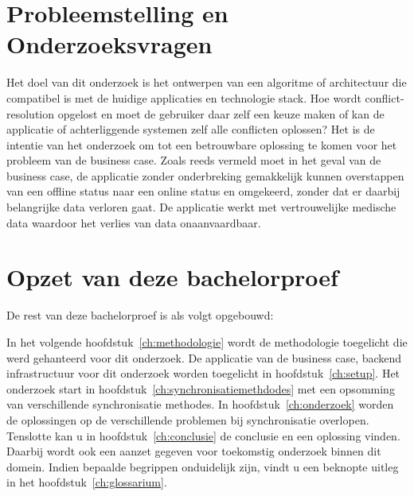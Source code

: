 \section{Probleemstelling en Onderzoeksvragen}
\label{sec:onderzoeksvragen}
Het doel van dit onderzoek is het ontwerpen van een algoritme of architectuur die compatibel is met de huidige applicaties en technologie stack. Hoe wordt conflict-resolution opgelost en moet de gebruiker daar zelf een keuze maken of kan de applicatie of achterliggende systemen zelf alle conflicten oplossen? Het is de intentie van het onderzoek om tot een betrouwbare oplossing te komen voor het probleem van de business case. Zoals reeds vermeld moet in het geval van de business case, de applicatie zonder onderbreking gemakkelijk kunnen overstappen van een offline status naar een online status en omgekeerd, zonder dat er daarbij belangrijke data verloren gaat. De applicatie werkt met vertrouwelijke medische data waardoor het verlies van data onaanvaardbaar.

\clearpage
\section{Opzet van deze bachelorproef}
\label{sec:opzet-bachelorproef}


De rest van deze bachelorproef is als volgt opgebouwd:

In het volgende hoofdstuk~\ref{ch:methodologie} wordt de methodologie toegelicht die werd gehanteerd voor dit onderzoek. De applicatie van de business case, backend infrastructuur voor dit onderzoek worden toegelicht in hoofdstuk~\ref{ch:setup}. Het onderzoek start in hoofdstuk~\ref{ch:synchronisatiemethdodes} met een opsomming van verschillende synchronisatie methodes. In hoofdstuk~\ref{ch:onderzoek} worden de oplossingen op de verschillende problemen bij synchronisatie overlopen. Tenslotte kan u in hoofdstuk~\ref{ch:conclusie} de conclusie en een oplossing vinden. Daarbij wordt ook een aanzet gegeven voor toekomstig onderzoek binnen dit domein. Indien bepaalde begrippen onduidelijk zijn, vindt u een beknopte uitleg in het hoofdstuk~\ref{ch:glossarium}.


